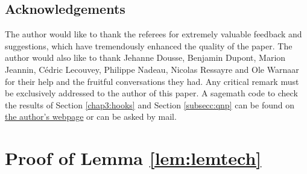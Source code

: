 \documentclass[11pt,letterpaper]{amsart}
\numberwithin{equation}{section}
\numberwithin{df}{section}
\begin{document}
\subsection*{Acknowledgements}
The author would like to thank the referees for extremely valuable feedback and suggestions, which have tremendously enhanced the quality of the paper. The author would also like to thank Jehanne Dousse, Benjamin Dupont, Marion Jeannin, Cédric Lecouvey, Philippe Nadeau, Nicolas Ressayre and Ole Warnaar for their help and the fruitful conversations they had. Any critical remark must be exclusively addressed to the author of this paper. A sagemath code to check the results of Section \ref{chap3:hooks} and Section \ref{subsecc:qnp} can be found on \href{https://www.idpoisson.fr/wahiche/indexEN.html}{the author's webpage} or can be asked by mail.

\appendix
\section{Proof of Lemma \ref{lem:lemtech}}\label{ap:sec1}
\end{document}
